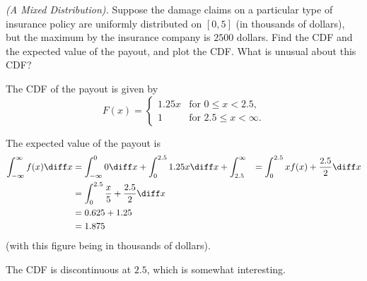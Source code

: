 \begin{problem}[Handout 12, \# 18]
  \emph{(A Mixed Distribution).} Suppose the damage claims on a particular
  type of insurance policy are uniformly distributed on \([0,5]\) (in
  thousands of dollars), but the maximum by the insurance company is
  \(2500\) dollars. Find the CDF and the expected value of the payout, and
  plot the CDF. What is unusual about this CDF?
\end{problem}
\begin{solution}
  The CDF of the payout is given by
  \[
    F(x) =
    \begin{cases}
      1.25x&\text{for \(0\leq x<2.5\),}\\
      1&\text{for \(2.5\leq x<\infty\).}
    \end{cases}
  \]

  The expected value of the payout is
  \begin{align*}
    \int_{-\infty}^\infty f(x) \diff x
    &=\int_{-\infty}^0 0\diff x+\int_0^{2.5} 1.25x\diff x
      +\int_{2.5}^\infty
    &= \int_0^{2.5} xf(x) + \frac{2.5}{2} \diff x\\
    &= \int_0^{2.5} \frac{x}{5}+\frac{2.5}{2} \diff x\\
    &= 0.625 + 1.25 \\
    &= 1.875
  \end{align*}
  (with this figure being in thousands of dollars).

  The CDF is discontinuous at $2.5$, which is somewhat interesting.
\end{solution}
\newpage

